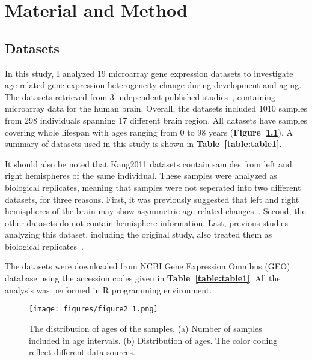 \chapter{Material and Method}
\label{chp:b2}

\section{Datasets}
In this study, I analyzed 19 microarray gene expression datasets to investigate age-related gene expression heterogeneity change during development and aging.
The datasets retrieved from 3 independent published studies~\cite{Colantuoni2011, Kang2011, Somel2011, Somel2010}, containing microarray data for the human brain.
Overall, the datasets included 1010 samples from 298 individuals spanning 17 different brain region. 
All datasets have samples covering whole lifespan with ages ranging from 0 to 98 years (\textbf{Figure~\ref{fig:fig2.1}}).
A summary of datasets used in this study is shown in \textbf{Table~\ref{table:table1}}.

It should also be noted that Kang2011 datasets contain samples from left and right hemispheres of the same individual.
These samples were analyzed as biological replicates, meaning that samples were not seperated into two different datasets, for three reasons.
First, it was previously suggested that left and right hemispheres of the brain may show asymmetric age-related changes~\cite{Sun2005, Dolcos2002}.
Second, the other datasets do not contain hemisphere information.
Last, previous studies analyzing this dataset, including the original study, also treated them as biological replicates~\cite{Kang2011,Donertas2017}.

The datasets were downloaded from NCBI Gene Expression Omnibus (GEO) database using the accession codes given in \textbf{Table~\ref{table:table1}}. 
All the analysis was performed in R programming environment.

\begin{figure}[h]
\centering
\texttt{[image: figures/figure2\_1.png]}
\caption{The distribution of ages of the samples. (a) Number of samples included in age intervals. (b) Distribution of ages. The color coding reflect different data sources. }\label{fig:fig2.1}
\end{figure}


